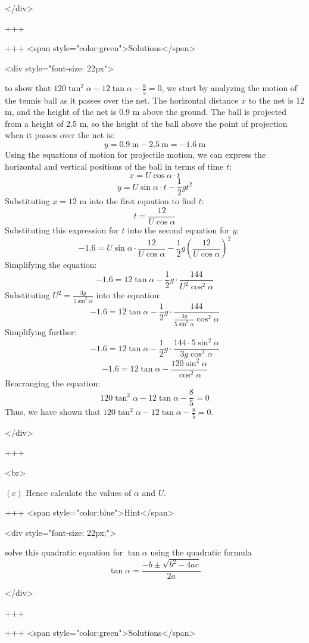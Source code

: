 </div>

+++

+++ <span style="color:green">Solutions</span>

<div style="font-size: 22px">

to show that \( 120 \tan^{2} \alpha - 12 \tan \alpha - \frac{8}{5} = 0 \), we start by analyzing the motion of the tennis ball as it passes over the net.
The horizontal distance \( x \) to the net is 12 m, and the height of the net is 0.9 m above the ground. The ball is projected from a height of 2.5 m, so the height of the ball above the point of projection when it passes over the net is:
$$ y = 0.9 \mathrm{~m} - 2.5 \mathrm{~m} = -1.6 \mathrm{~m} $$
Using the equations of motion for projectile motion, we can express the horizontal and vertical positions of the ball in terms of time \( t \):
$$ x = U \cos \alpha \cdot t $$
$$ y = U \sin \alpha \cdot t - \frac{1}{2} g t^2 $$
Substituting \( x = 12 \) m into the first equation to find \( t \):
$$ t = \frac{12}{U \cos \alpha} $$
Substituting this expression for \( t \) into the second equation for \( y \):
$$ -1.6 = U \sin \alpha \cdot \frac{12}{U \cos \alpha} - \frac{1}{2} g \left( \frac{12}{U \cos \alpha} \right)^2 $$
Simplifying the equation:
$$ -1.6 = 12 \tan \alpha - \frac{1}{2} g \cdot \frac{144}{U^2 \cos^2 \alpha} $$
Substituting \( U^2 = \frac{3g}{5 \sin^2 \alpha} \) into the equation:
$$ -1.6 = 12 \tan \alpha - \frac{1}{2} g \cdot \frac{144}{\frac{3g}{5 \sin^2 \alpha} \cos^2 \alpha} $$
Simplifying further:
$$ -1.6 = 12 \tan \alpha - \frac{1}{2} g \cdot \frac{144 \cdot 5 \sin^2 \alpha}{3g \cos^2 \alpha} $$
$$ -1.6 = 12 \tan \alpha - \frac{120 \sin^2 \alpha}{\cos^2 \alpha} $$
Rearranging the equation:
$$ 120 \tan^2 \alpha - 12 \tan \alpha - \frac{8}{5} = 0 $$
Thus, we have shown that \( 120 \tan^{2} \alpha - 12 \tan \alpha - \frac{8}{5} = 0 \).

</div>

+++

<br>

\((c)\) Hence calculate the values of $\alpha$ and $U$.

+++ <span style="color:blue">Hint</span>

<div style="font-size: 22px;">

solve this quadratic equation for \( \tan \alpha \) using the quadratic formula
$$ \tan \alpha = \frac{-b \pm \sqrt{b^2 - 4ac}}{2a} $$

</div>

+++

+++ <span style="color:green">Solutions</span>

